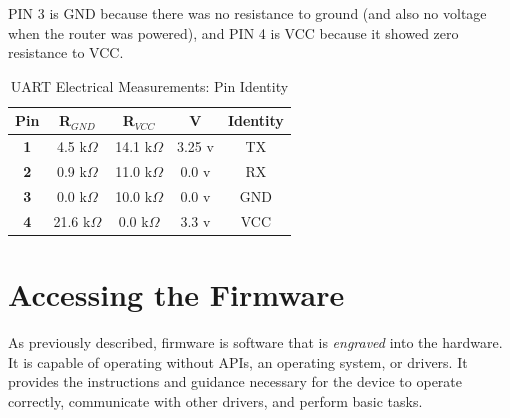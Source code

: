 \documentclass[12pt,a4paper, brazil]{article}
\begin{document}
PIN 3 is GND because there was no resistance to ground (and also no voltage when the router was powered), and PIN 4 is VCC because it showed zero resistance to VCC.

\begin{table}[htpb]
\centering
\caption{UART Electrical Measurements: Pin Identity}
\label{tab:my-table}
\begin{tabular}{@{}ccccc@{}}
\toprule
{\color[HTML]{FE0000} \textbf{Pin}} & {\color[HTML]{FE0000} \textbf{R$_{GND}$}}                 & {\color[HTML]{FE0000} \textbf{R$_{VCC}$}}                 & {\color[HTML]{FE0000} \textbf{V}} & \multicolumn{1}{l}{{\color[HTML]{3166FF} \textbf{Identity}}} \\ \midrule
\multicolumn{1}{|c|}{\textbf{1}}    & \multicolumn{1}{c|}{4.5 k$\Omega$}                        & \multicolumn{1}{c|}{14.1 k$\Omega$}                       & \multicolumn{1}{c|}{3.25 v}       & \multicolumn{1}{c|}{TX}                                       \\ \midrule
\multicolumn{1}{|c|}{\textbf{2}}    & \multicolumn{1}{c|}{0.9 k$\Omega$}                        & \multicolumn{1}{c|}{11.0 k$\Omega$}                       & \multicolumn{1}{c|}{0.0 v}        & \multicolumn{1}{c|}{RX}                                       \\ \midrule
\multicolumn{1}{|c|}{\textbf{3}}    & \multicolumn{1}{c|}{{\color[HTML]{FE0000} 0.0 k$\Omega$}} & \multicolumn{1}{c|}{10.0 k$\Omega$}                       & \multicolumn{1}{c|}{0.0 v}        & \multicolumn{1}{c|}{GND}                                      \\ \midrule
\multicolumn{1}{|c|}{\textbf{4}}    & \multicolumn{1}{c|}{21.6 k$\Omega$}                       & \multicolumn{1}{c|}{{\color[HTML]{FE0000} 0.0 k$\Omega$}} & \multicolumn{1}{c|}{3.3 v}        & \multicolumn{1}{c|}{VCC}                                      \\ \bottomrule
\end{tabular}
\end{table}

\section{Accessing the Firmware}

As previously described, firmware is software that is \emph{engraved} into the hardware. It is capable of operating without APIs, an operating system, or drivers. It provides the instructions and guidance necessary for the device to operate correctly, communicate with other drivers, and perform basic tasks.
\end{document}

